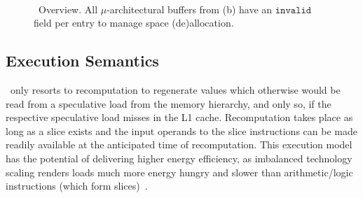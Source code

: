  
 \begin{figure}
     \centering
     ~~~
     \caption{ \arch\ Overview. All $\mu$-architectural buffers from (b) have  
an $\texttt{invalid}$ field per entry to
manage space (de)allocation.}
     \label{fig:overview}
\end{figure}
 
 
 \subsection{Execution Semantics}
 
 \arch\ only resorts to recomputation to regenerate values which otherwise would be read from a speculative load from the memory hierarchy, and only so, if the respective speculative load misses in the L1 cache. Recomputation takes place as long as a slice exists and the input operands to the slice instructions can be made readily available at the anticipated time of recomputation. This execution model has the potential of delivering higher energy efficiency, as imbalanced technology scaling renders loads much more energy hungry and slower than arithmetic/logic instructions (which form slices)~\cite{Horow}. 
 
